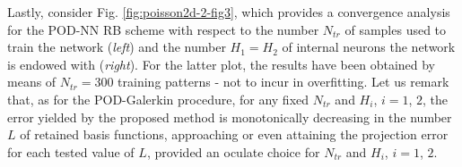 \documentclass[12pt, a4paper, twoside, openright, notitlepage]{report}
\numberwithin{equation}{chapter}
\theoremstyle{theorem}
\theoremstyle{definition}
\theoremstyle{remark}
\theoremstyle{proposition}
\numberwithin{figure}{chapter}
\begin{document}
		Lastly, consider Fig. \ref{fig:poisson2d-2-fig3}, which provides a convergence analysis for the POD-NN RB scheme with respect to the number $N_{tr}$ of samples used to train the network (\emph{left}) and the number $H_1 = H_2$ of internal neurons the network is endowed with (\emph{right}). For the latter plot, the results have been obtained by means of $N_{tr} = 300$ training patterns - not to incur in overfitting. Let us remark that, as for the POD-Galerkin procedure, for any fixed $N_{tr}$ and $H_i$, $i = 1$, $2$, the error yielded by the proposed method is monotonically decreasing in the number $L$ of retained basis functions, approaching or even attaining the projection error for each tested value of $L$, provided an oculate choice for $N_{tr}$ and $H_i$, $i = 1$, $2$. 
		
		\newpage
				
		\vspace*{-1.1cm}
		
\end{document}
